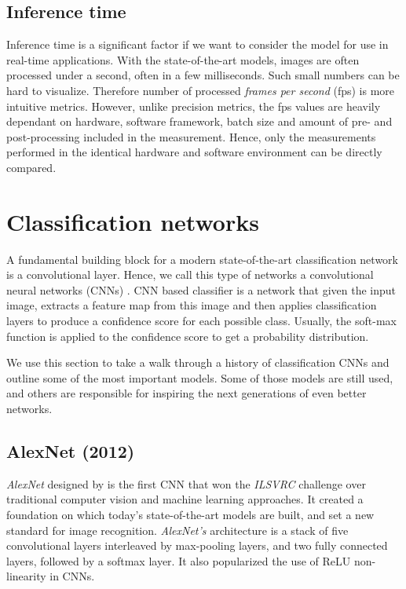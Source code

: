 \subsection*{Inference time}
Inference time is a significant factor if we want to consider the model for use in real-time applications. With the state-of-the-art models, images are often processed under a second, often in a few milliseconds. Such small numbers can be hard to visualize. Therefore number of processed \textit{frames per second} (fps) is more intuitive metrics. However, unlike precision metrics, the fps values are heavily dependant on hardware, software framework, batch size and amount of pre- and post-processing included in the measurement. Hence, only the measurements performed in the identical hardware and software environment can be directly compared.

\section{Classification networks}
\label{sec:clsnets}
A fundamental building block for a modern state-of-the-art classification network is a convolutional layer. Hence, we call this type of networks a convolutional neural networks (CNNs) \cite[ch.~9]{bib:dlbook}. CNN based classifier is a network that given the input image, extracts a feature map from this image and then applies classification layers to produce a confidence score for each possible class. Usually, the soft-max function is applied to the confidence score to get a probability distribution.

We use this section to take a walk through a history of classification CNNs and outline some of the most important models. Some of those models are still used, and others are responsible for inspiring the next generations of even better networks.

\subsection{AlexNet (2012)}
\textit{AlexNet} designed by \citeauthor{bib:alexnet} \cite{bib:alexnet} is the first CNN that won the \textit{ILSVRC} challenge over traditional computer vision and machine learning approaches. It created a foundation on which today's state-of-the-art models are built, and set a new standard for image recognition. \textit{AlexNet's} architecture is a stack of five convolutional layers interleaved by max-pooling layers, and two fully connected layers, followed by a softmax layer. It also popularized the use of ReLU non-linearity in CNNs.

